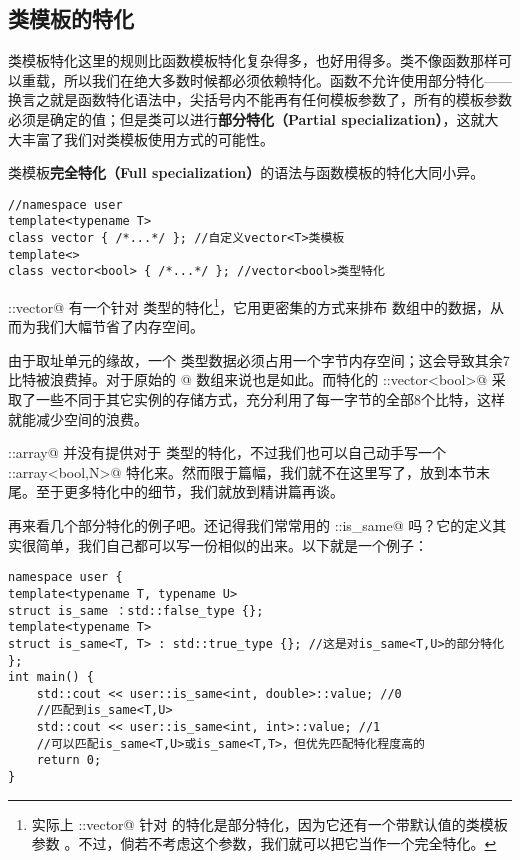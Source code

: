 \subsection*{类模板的特化}
类模板特化这里的规则比函数模板特化复杂得多，也好用得多。类不像函数那样可以重载，所以我们在绝大多数时候都必须依赖特化。函数不允许使用部分特化——换言之就是函数特化语法中，尖括号内不能再有任何模板参数了，所有的模板参数必须是确定的值；但是类可以进行\textbf{部分特化（Partial specialization）}，这就大大丰富了我们对类模板使用方式的可能性。\par
类模板\textbf{完全特化（Full specialization）}的语法与函数模板的特化大同小异。
\begin{lstlisting}
//namespace user
template<typename T>
class vector { /*...*/ }; //自定义vector<T>类模板
template<>
class vector<bool> { /*...*/ }; //vector<bool>类型特化
\end{lstlisting}\par
\lstinline@std::vector@ 有一个针对 \lstinline@bool@ 类型的特化\footnote{实际上 \lstinline@std::vector@ 针对 \lstinline@bool@ 的特化是部分特化，因为它还有一个带默认值的类模板参数 \lstinline@Allocator@。不过，倘若不考虑这个参数，我们就可以把它当作一个完全特化。}，它用更密集的方式来排布 \lstinline@bool@ 数组中的数据，从而为我们大幅节省了内存空间。\par
由于取址单元的缘故，一个 \lstinline@bool@ 类型数据必须占用一个字节内存空间；这会导致其余7比特被浪费掉。对于原始的 \lstinline@bool[]@ 数组来说也是如此。而特化的 \lstinline@std::vector<bool>@ 采取了一些不同于其它实例的存储方式，充分利用了每一字节的全部8个比特，这样就能减少空间的浪费。\par
\lstinline@std::array@ 并没有提供对于 \lstinline@bool@ 类型的特化，不过我们也可以自己动手写一个 \lstinline@user::array<bool,N>@ 特化来。然而限于篇幅，我们就不在这里写了，放到本节末尾。至于更多特化中的细节，我们就放到精讲篇再谈。\par
再来看几个部分特化的例子吧。还记得我们常常用的 \lstinline@std::is_same@ 吗？它的定义其实很简单，我们自己都可以写一份相似的出来。以下就是一个例子：
\begin{lstlisting}
namespace user {
template<typename T, typename U>
struct is_same ：std::false_type {};
template<typename T>
struct is_same<T, T> : std::true_type {}; //这是对is_same<T,U>的部分特化
};
int main() {
    std::cout << user::is_same<int, double>::value; //0
    //匹配到is_same<T,U>
    std::cout << user::is_same<int, int>::value; //1
    //可以匹配is_same<T,U>或is_same<T,T>，但优先匹配特化程度高的
    return 0;
}
\end{lstlisting}\par
